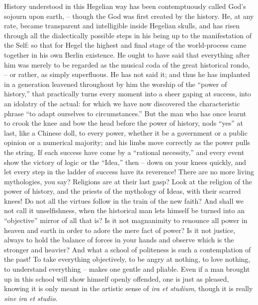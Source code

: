 History understood in this Hegelian way has been contemptuously
called God's sojourn upon earth, -- though the God was first created by
the history. He, at any rate, became transparent and intelligible
inside Hegelian skulls, and has risen through all the dialectically
possible steps in his being up to the manifestation of the Self: so
that for Hegel the highest and final stage of the world-process came
together in his own Berlin existence. He ought to have said that
everything after him was merely to be regarded as the musical coda of
the great historical rondo, -- or rather, as simply superfluous. He has
not said it; and thus he has implanted in a generation leavened
throughout by him the worship of the \enquote{power of history,} that
practically turns every moment into a sheer gaping at success, into
an idolatry of the actual: for which we have now discovered the
characteristic phrase \enquote{to adapt ourselves to circumstances.} But the
man who has once learnt to crook the knee and bow the head before the
power of history, nods \enquote{yes} at last, like a Chinese doll, to every
power, whether it be a government or a public opinion or a numerical
majority; and his limbs move correctly as the power pulls the string.
If each success have come by a \enquote{rational necessity,} and every event
show the victory of logic or the \enquote{Idea,} then -- down on your knees
quickly, and let every step in the ladder of success have its
reverence! There are no more living mythologies, you say? Religions
are at their last gasp? Look at the religion of the power of history,
and the priests of the mythology of Ideas, with their scarred knees!
Do not all the virtues follow in the train of the new faith? And
shall we not call it unselfishness, when the historical man lets
himself be turned into an \enquote{objective} mirror of all that is? Is it
not magnanimity to renounce all power in heaven and earth in order to
adore the mere fact of power? Is it not justice, always to hold the
balance of forces in your hands and observe which is the stronger and
heavier? And what a school of politeness is such a contemplation of
the past! To take everything objectively, to be angry at nothing, to
love nothing, to understand everything -- makes one gentle and pliable.
Even if a man brought up in this school will show himself openly
offended, one is just as pleased, knowing it is only meant in the
artistic sense of \textit{ira et studium}, though it is really \textit{sine ira et
studio}.

